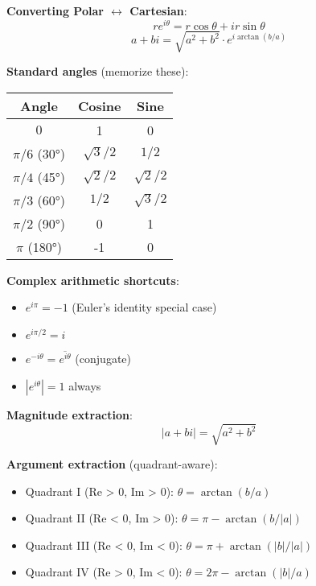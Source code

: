 \begin{tcolorbox}[colback=yellow!10!white,colframe=yellow!75!black,title=Calculation Quick Guide]

\textbf{Converting Polar $\leftrightarrow$ Cartesian}:
$$re^{i\theta} = r\cos\theta + ir\sin\theta$$
$$a + bi = \sqrt{a^2+b^2} \cdot e^{i\arctan(b/a)}$$

\textbf{Standard angles} (memorize these):
\begin{center}
\begin{tabular}{|c|c|c|}
\hline
Angle & Cosine & Sine \\
\hline
$0$ & 1 & 0 \\
$\pi/6$ (30°) & $\sqrt{3}/2$ & $1/2$ \\
$\pi/4$ (45°) & $\sqrt{2}/2$ & $\sqrt{2}/2$ \\
$\pi/3$ (60°) & $1/2$ & $\sqrt{3}/2$ \\
$\pi/2$ (90°) & 0 & 1 \\
$\pi$ (180°) & -1 & 0 \\
\hline
\end{tabular}
\end{center}

\textbf{Complex arithmetic shortcuts}:
\begin{itemize}
\item $e^{i\pi} = -1$ (Euler's identity special case)
\item $e^{i\pi/2} = i$
\item $e^{-i\theta} = \overline{e^{i\theta}}$ (conjugate)
\item $|e^{i\theta}| = 1$ always
\end{itemize}

\textbf{Magnitude extraction}:
$$|a + bi| = \sqrt{a^2 + b^2}$$

\textbf{Argument extraction} (quadrant-aware):
\begin{itemize}
\item Quadrant I (Re > 0, Im > 0): $\theta = \arctan(b/a)$
\item Quadrant II (Re < 0, Im > 0): $\theta = \pi - \arctan(b/|a|)$
\item Quadrant III (Re < 0, Im < 0): $\theta = \pi + \arctan(|b|/|a|)$
\item Quadrant IV (Re > 0, Im < 0): $\theta = 2\pi - \arctan(|b|/a)$
\end{itemize}

\end{tcolorbox}

